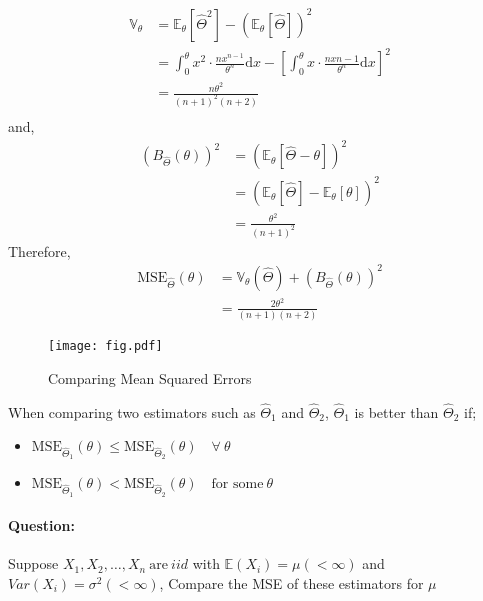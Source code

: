 \documentclass[12pt,a4paper]{article}
\begin{document}
   \begin{align*}
    \mathbb{V}_{\theta}&=\mathbb{E}_{\theta}\left[ \hat{\Theta}^2 \right] - \left( \mathbb{E}_{\theta}\left[ \hat{\Theta} \right]    \right)^2 \\
    &= \int_{0}^{\theta} x^2 \cdot \frac{nx^{n-1}}{\theta^n}\mathrm{d}x
    - \left[\int_{0}^{\theta} x \cdot \frac{nx{n-1}}{\theta^n}\mathrm{d}x\right]^2 \\
    &= \frac{n\theta^2}{(n+1)^2(n+2)}\\
   \end{align*}
   and,
   \begin{align*}
    \left(B_{\hat{\Theta}}(\theta)\right)^2&= (\mathbb{E}_{\theta}[\hat{\Theta}-\theta])^2\\
    &= (\mathbb{E}_{\theta}[\hat{\Theta}]-\mathbb{E}_{\theta}[\theta])^2\\
    &= \frac{\theta^2}{(n+1)^2}
   \end{align*}
   Therefore,
   \begin{align*}
    \mathrm{MSE}_{\hat{\Theta}}(\theta)&= \mathbb{V}_{\theta}(\hat{\Theta})+ \left( B_{\hat{\Theta}}(\theta) \right)^2 \\
    &= \frac{2\theta^2}{(n+1)(n+2)}
   \end{align*}
   
   \begin{figure}[h]
       \centering
       \texttt{[image: fig.pdf]}
       \caption{Comparing Mean Squared Errors}
       \label{Label}
   \end{figure}
    
   When comparing two estimators such as \(\hat{\Theta}_{1}\) and \(\hat{\Theta}_{2}\), \(\hat{\Theta}_{1}\) is better than \(\hat{\Theta}_{2}\) if;
   \begin{itemize}
    \item \(\mathrm{MSE}_{\hat{\Theta}_{1}}(\theta) \leq \mathrm{MSE}_{\hat{\Theta}_{2}}(\theta) \quad \forall \ \theta\)
    \item \(\mathrm{MSE}_{\hat{\Theta}_{1}}(\theta) < \mathrm{MSE}_{\hat{\Theta}_{2}}(\theta) \quad \text{for some} \ \theta\)    
   \end{itemize}        
    
   
   \paragraph{Question:}
    Suppose \(X_{1},X_{2},\ldots,X_{n} \  \text{are} \ iid \) with \(\mathbb{E}(X_{i})=\mu (< \infty)\) and \(Var(X_{i})=\sigma^2 (<\infty)\),
    Compare the MSE of these estimators for \(\mu\) 
\end{document}
